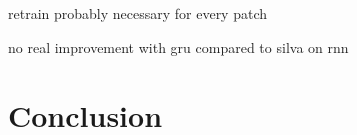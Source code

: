 \documentclass[12pt, a4paper, headinclude, twoside, plainheadsepline, open=right, numbers=noenddot, hidelinks, toc=listof, toc=bibliography]{scrreprt}
\begin{document}
retrain probably necessary for every patch

no real improvement with gru compared to silva on rnn
\chapter{Conclusion}
\label{chap:conclusion}

%
%
%
\printbibliography

\appendix




\listoffigures																			%
\listoftables																			%
\cleardoublepage{}	%
\printacronyms[heading={chapter*}, name={List of Abbreviations}]
\end{document}

